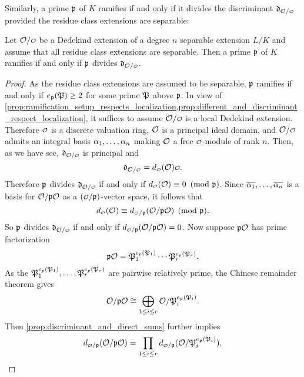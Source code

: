     Similarly, a prime $\mathfrak{p}$ of $K$ ramifies if and only if it divides the discriminant $\mf{d}_{\mc{O}/\smc{O}}$ provided the residue class extensions are separable:

    \begin{theorem}\label{thm:ramifies_if_and_only_if_divides_the_discriminant}
      Let $\mc{O}/\smc{O}$ be a Dedekind extension of a degree $n$ separable extension $L/K$ and assume that all residue class extensions are separable. Then a prime $\mathfrak{p}$ of $K$ ramifies if and only if $\mathfrak{p}$ divides $\mf{d}_{\mc{O}/\smc{O}}$.
    \end{theorem}
    \begin{proof}
      As the residue class extensions are assumed to be separable, $\mathfrak{p}$ ramifies if and only if $e_{\mathfrak{p}}(\mathfrak{P}) \ge 2$ for some prime $\mathfrak{P}$ above $\mathfrak{p}$. In view of \cref{prop:ramification_setup_respects_localization,prop:different_and_discriminant_respect_localization}, it suffices to assume $\mc{O}/\smc{O}$ is a local Dedekind extension. Therefore $\smc{O}$ is a discrete valuation ring, $\mathcal{O}$ is a principal ideal domain, and $\mc{O}/\smc{O}$ admits an integral basis $\alpha_{1},\ldots,\alpha_{n}$ making $\mathcal{O}$ a free $\smc{O}$-module of rank $n$. Then, as we have see, $\mf{d}_{\mc{O}/\smc{O}}$ is principal and
      \[
        \mf{d}_{\mc{O}/\smc{O}} = d_{\smc{O}}(\mc{O})\smc{O}.
      \]
      Therefore $\mathfrak{p}$ divides $\mf{d}_{\mc{O}/\smc{O}}$ if and only if $d_{\smc{O}}(\mc{O}) \equiv 0 \tmod{\mf{p}}$. Since $\overline{\alpha_{1}},\ldots,\overline{\alpha_{n}}$ is a basis for $\mathcal{O}/\mathfrak{p}\mathcal{O}$ as a $(\smc{O}/\mf{p})$-vector space, it follows that
      \[
        d_{\smc{O}}(\mc{O}) \equiv d_{\smc{O}/\mf{p}}(\mc{O}/\mf{p}\mc{O}) \pmod{\mf{p}}.
      \]
      So $\mathfrak{p}$ divides $\mf{d}_{\mc{O}/\smc{O}}$ if and only if $d_{\smc{O}/\mf{p}}(\mc{O}/\mf{p}\mc{O}) = 0$. Now suppose $\mathfrak{p}\mathcal{O}$ has prime factorization
      \[
        \mathfrak{p}\mathcal{O} = \mathfrak{P}_{1}^{e_{p}(\mathfrak{P}_{1})} \cdots \mathfrak{P}_{r}^{e_{p}(\mathfrak{P}_{r})}.
      \]
      As the $\mathfrak{P}_{1}^{e_{p}(\mathfrak{P}_{1})},\ldots,\mathfrak{P}_{r}^{e_{p}(\mathfrak{P}_{r})}$ are pairwise relatively prime, the Chinese remainder theorem gives
      \[
        \mathcal{O}/\mathfrak{p}\mathcal{O} \cong \bigoplus_{1 \le i \le r} \mathcal{O}/\mathfrak{P}_{i}^{e_{\mathfrak{p}}(\mathfrak{P}_{i})}.
      \]
      Then \cref{prop:discriminant_and_direct_sums} further implies
      \[
        d_{\smc{O}/\mf{p}}(\mc{O}/\mf{p}\mc{O}) = \prod_{1 \le i \le r}d_{\smc{O}/\mf{p}}(\mc{O}/\mf{P}_{i}^{e_{\mf{p}}(\mf{P}_{i})}),
      \]

\end{proof}
